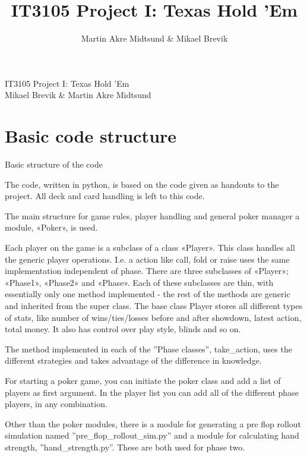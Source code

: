 \documentclass[a4paper, 12pt]{article}
\title{IT3105 Project I: Texas Hold 'Em}
\author{Martin Akre Midtsund & Mikael Brevik}
\begin{document}
\begin{titlepage}

	\begin{center}
		{ \LARGE IT3105 Project I: Texas Hold 'Em }\\[1.5cm]

		{ \Large Mikael Brevik \& Martin Akre Midtsund }\\[0.5cm]

	\end{center}

\end{titlepage}

\newpage

\tableofcontents
\listoffigures
\listoftables
\thispagestyle{fancy}
\newpage


\section{Basic code structure}

Basic structure of the code

The code, written in python, is based on the code given as handouts to the project. All deck and card handling is left to this code. 

The main structure for game rules, player handling and general poker manager a module, «Poker», is used. 

Each player on the game is a subclass of a class «Player». This class handles all the generic player operations. I.e. a action like call, fold or raise uses the same implementation independent of phase. There are three subclasses of «Player»; «Phase1», «Phase2» and «Phase». Each of these subclasses are thin, with essentially only one method implemented - the rest of the methods are generic and inherited from the super class. The base class Player stores all different types of stats, like number of wins/ties/losses before and after showdown, latest action, total money. It also has control over play style, blinds and so on.

The method implemented in each of the ''Phase classes'', take\_action, uses the different strategies and takes advantage of the difference in knowledge. 

For starting a poker game, you can initiate the poker class and add a list of players as first argument. In the player list you can add all of the different phase players, in any combination. 

Other than the poker modules, there is a module for generating a pre flop rollout simulation named ''pre\_flop\_rollout\_sim.py'' and a module for calculating hand strength, ''hand\_strength.py''. These are both used for phase two. 
\end{document}
